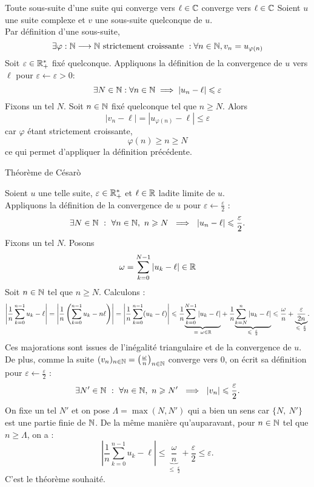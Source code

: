 \documentclass{article}
\renewenvironment{question_kholle}[2][ ]
{
	\subsection{\texorpdfstring{#2}{}}
	\notblank{#1}
	{
		\noindent #1
		\bigbreak
	}
	{}
	\begin{proof}
}
{
	\end{proof}
}
\begin{document}
\begin{question_kholle}{Toute sous-suite d’une suite qui converge
		vers $\ell\in\mathbb C$ converge vers $\ell\in\mathbb C$}
	Soient $u$ une suite complexe et $v$ une sous-suite quelconque de $u$.\\
	Par définition d’une sous-suite,
	\[
		\exists \varphi:\mathbb N\longrightarrow\mathbb N \text{ strictement croissante
		}: \forall n\in\mathbb N, v_{n}=u_{\varphi(n)}
	\]
	Soit $\varepsilon\in\mathbb R_{+}^{*}$ fixé quelconque. Appliquons la
	définition de la convergence de $u$ vers $\ell$ pour
	$\varepsilon\leftarrow \varepsilon>0$:
	\[
		\exists N\in\mathbb N:\forall n\in\mathbb N \implies |u_{n}-\ell|\leqslant \varepsilon
	\]
	Fixons un tel $N$. Soit $n\in\mathbb N$ fixé quelconque tel que $n\geq N$. Alors
	\[
		|v_{n}-\ell|=|u_{\varphi(n)}-\ell|\leq \varepsilon
	\]
	car $\varphi$ étant strictement croissante,
	\[
		\varphi(n)\geq n \geq N
	\]
	ce qui permet d’appliquer la définition précédente.

\end{question_kholle}

\begin{question_kholle}
	{Théorème de Césarò}

	Soient $u$ une telle suite, $\varepsilon \in \mathbb R ^*_+$ et $\ell \in
		\mathbb R$ ladite limite de $u$.\\
	Appliquons la définition de la convergence de $u$ pour $\varepsilon
		\gets \frac{\varepsilon}{2}$ :
	\[
		\exists N \in \N \ : \ \forall n \in \N , \ n\geq N \ \implies
		\ |u_n - \ell | \leq \frac{\varepsilon}{2}.
	\]
	Fixons un tel $N$. Posons
	\[
		\omega = \sum_{k=0}^{N-1} |u_k - \ell | \in \mathbb R
	\]
	Soit $n\in \mathbb N$ tel que $n \geq N$. Calculons :
	\[
		\left| \frac{1}{n} \sum_{k=0}^{n-1}u_k - \ell \right| = \left|
		\frac{1}{n} \left( \sum_{k=0}^{n-1}u_k - n\ell \right) \right|  =
		\left| \frac{1}{n} \sum_{k=0}^{n-1}(u_k - \ell)  \right| \leq
		\frac{1}{n} \underset{= \ \omega \in
			\R}{\underbrace{\sum_{k=0}^{N-1}|u_k - \ell|}} + \frac{1}{n}
		\underset{\leq
			\ \frac{\varepsilon}{2}}{\underbrace{\sum_{k=N}^{n}|u_k - \ell|}}
		\leq \frac{\omega}{n} + \underset{\leq
			\ \frac{\varepsilon}{2}}{\underbrace{\frac{\varepsilon}{2n}}}.
	\]
	Ces majorations sont issues de l'inégalité triangulaire et de la
	convergence de $u$.\\
	De plus, comme la suite $(v_n) _{n\in \mathbb N} = \left( \frac{\omega}{n}
		\right) _{n\in \mathbb N}$ converge vers $0$, on écrit sa définition pour
	$\varepsilon \gets \frac{\varepsilon}{2}$ :
	\[
		\exists N' \in \mathbb N \ : \ \forall n \in \mathbb N , \ n\geqslant N' \ \implies
		\ |v_n| \leqslant \frac{\varepsilon}{2}.
	\]
	On fixe un tel $N'$ et on pose $\Lambda = \max{(N, N')}$ qui a bien
	un sens car $\{N, \ N'\}$ est une partie finie de $\mathbb N$.
	De la même manière qu'auparavant, pour $n\in \mathbb N$ tel que $n \geq
		\Lambda$, on a :
	\[
		\left| \frac{1}{n} \sum_{k=0}^{n-1}u_k - \ell \right| \leq
		\underset{\leq
			\ \frac{\varepsilon}{2}}{\underbrace{\frac{\omega}{n}}} +
		\frac{\varepsilon}{2} \leq \varepsilon.
	\]
	C'est le théorème souhaité.
\end{question_kholle}
\end{document}
